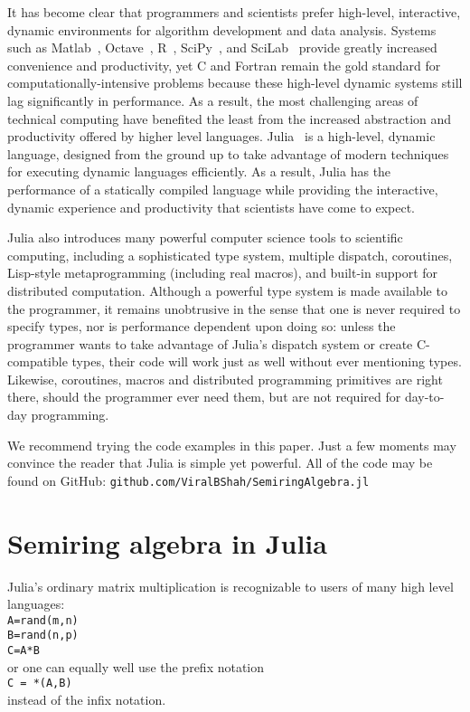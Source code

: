 \documentclass[conference]{IEEEtran}
\begin{document}
It has become clear that programmers and scientists prefer high-level, interactive, dynamic environments for algorithm development and data analysis.
Systems such as Matlab~\cite{matlab}, Octave~\cite{Octave}, R~\cite{Rlang}, SciPy~\cite{numpy}, and SciLab~\cite{scilab} provide greatly increased convenience and productivity, yet C and Fortran remain the gold standard for computationally-intensive problems because these high-level dynamic systems still lag significantly in performance.
As a result, the most challenging areas of technical computing have benefited the least from the increased abstraction and productivity offered by higher level languages.
Julia~\cite{julia} is a high-level, dynamic language, designed from the ground up to take advantage of modern techniques for executing dynamic languages efficiently.
As a result, Julia has the performance of a statically compiled language while providing the interactive, dynamic experience and productivity that scientists have come to expect.

Julia also introduces many powerful computer science tools to scientific computing, including a sophisticated type system, multiple dispatch, coroutines, Lisp-style metaprogramming (including real macros), and built-in support for distributed computation.
Although a powerful type system is made available to the programmer, it remains unobtrusive in the sense that one is never required to specify types, nor is performance dependent upon doing so:
unless the programmer wants to take advantage of Julia's dispatch system or create C-compatible types, their code will work just as well without ever mentioning types.
Likewise, coroutines, macros and distributed programming primitives are right there, should the programmer ever need them, but are not required for day-to-day programming.

We recommend trying the code examples in this paper.
Just a few moments may convince the reader that Julia is simple yet powerful.
All of the code may be found on GitHub:
\verb+github.com/ViralBShah/SemiringAlgebra.jl+

\section{Semiring algebra in Julia}

Julia's ordinary matrix multiplication is recognizable to users of many
high level languages: \\
{\tt A=rand(m,n) \\  B=rand(n,p) \\ C=A*B } \\
or one can equally well use the prefix notation \\
{\tt C = *(A,B)} \\
instead of the infix notation.
\end{document}
